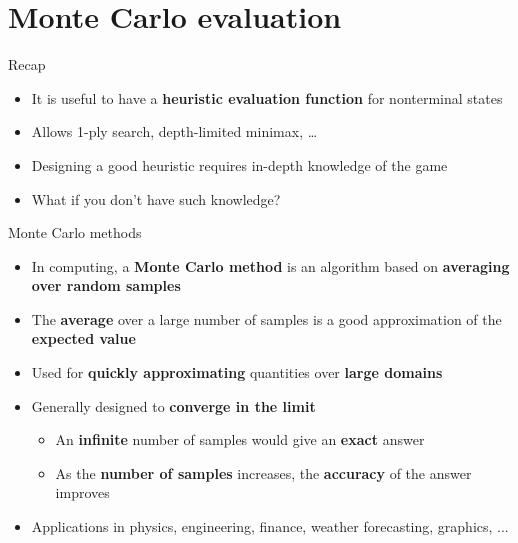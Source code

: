 \part{Monte Carlo evaluation}
\frame{\partpage}

\begin{frame}{Recap}
	\begin{itemize}
		\pause\item It is useful to have a \textbf{heuristic evaluation function} for nonterminal states
		\pause\item Allows 1-ply search, depth-limited minimax, \dots
		\pause\item Designing a good heuristic requires in-depth knowledge of the game
		\pause\item What if you don't have such knowledge?
	\end{itemize}
\end{frame}

\begin{frame}{Monte Carlo methods}
	\begin{itemize}
		\pause\item In computing, a \textbf{Monte Carlo method} is an algorithm based on \textbf{averaging over random samples}
		\pause\item The \textbf{average} over a large number of samples is a good approximation of the \textbf{expected value}
		\pause\item Used for \textbf{quickly approximating} quantities over \textbf{large domains}
		\pause\item Generally designed to \textbf{converge in the limit}
			\begin{itemize}
				\pause\item An \textbf{infinite} number of samples would give an \textbf{exact} answer
				\pause\item As the \textbf{number of samples} increases, the \textbf{accuracy} of the answer improves
			\end{itemize}
		\pause\item Applications in physics, engineering, finance, weather forecasting, graphics, ...
	\end{itemize}
\end{frame}

